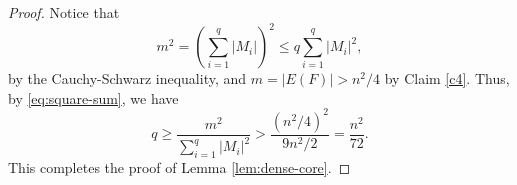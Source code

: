 \documentclass[10pt,a4paper]{amsart}
\begin{document}
\begin{proof}
Notice that
\[
m^2=\left(\sum_{i=1}^q |M_i|\right)^2\le q\sum_{i=1}^q |M_i|^2,
\]
by the Cauchy-Schwarz inequality, and $m=|E(F)|> n^2/4$ by Claim \ref{c4}. Thus, by \eqref{eq:square-sum}, we have
\[
q\ge \frac{m^2}{\sum_{i=1}^q |M_i|^2}
>\frac{(n^2/4)^2}{9n^2/2}
=\frac{n^2}{72}.
\]
This completes the proof of Lemma \ref{lem:dense-core}.
\end{proof}
\end{document}

